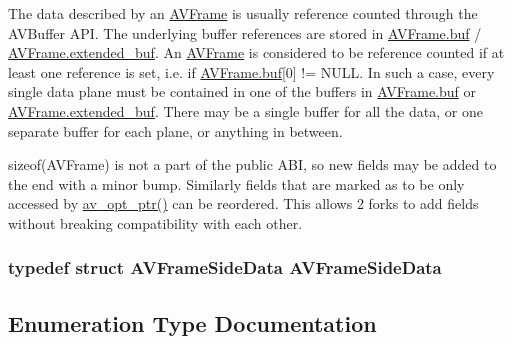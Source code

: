 The data described by an \hyperlink{struct_a_v_frame}{A\+V\+Frame} is usually reference counted through the A\+V\+Buffer A\+PI. The underlying buffer references are stored in \hyperlink{struct_a_v_frame_a4a64d05cc676bfa8e18bf22d16c8a51f}{A\+V\+Frame.\+buf} / \hyperlink{struct_a_v_frame_a254a144d113ceedc003ec1547cc5bd54}{A\+V\+Frame.\+extended\+\_\+buf}. An \hyperlink{struct_a_v_frame}{A\+V\+Frame} is considered to be reference counted if at least one reference is set, i.\+e. if \hyperlink{struct_a_v_frame_a4a64d05cc676bfa8e18bf22d16c8a51f}{A\+V\+Frame.\+buf}\mbox{[}0\mbox{]} != N\+U\+LL. In such a case, every single data plane must be contained in one of the buffers in \hyperlink{struct_a_v_frame_a4a64d05cc676bfa8e18bf22d16c8a51f}{A\+V\+Frame.\+buf} or \hyperlink{struct_a_v_frame_a254a144d113ceedc003ec1547cc5bd54}{A\+V\+Frame.\+extended\+\_\+buf}. There may be a single buffer for all the data, or one separate buffer for each plane, or anything in between.

sizeof(\+A\+V\+Frame) is not a part of the public A\+BI, so new fields may be added to the end with a minor bump. Similarly fields that are marked as to be only accessed by \hyperlink{group__avoptions_gab1d208d09e487741a28016919225bef6}{av\+\_\+opt\+\_\+ptr()} can be reordered. This allows 2 forks to add fields without breaking compatibility with each other. 
\subsubsection[{\texorpdfstring{A\+V\+Frame\+Side\+Data}{AVFrameSideData}}]{\setlength{\rightskip}{0pt plus 5cm}typedef struct {\bf A\+V\+Frame\+Side\+Data}  {\bf A\+V\+Frame\+Side\+Data}}\hypertarget{group__lavu__frame_gacd0daf404bac7e57b287feb110cc2ae6}{}\label{group__lavu__frame_gacd0daf404bac7e57b287feb110cc2ae6}


\subsection{Enumeration Type Documentation}
